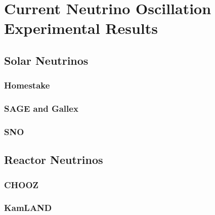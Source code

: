 \chapter{Current Neutrino Oscillation Experimental Results}
\label{current_results_chapter}


\section{Solar Neutrinos}

\subsection{Homestake}

\subsection{SAGE and Gallex}

\subsection{SNO}

\section{Reactor Neutrinos}

\subsection{CHOOZ}

\subsection{KamLAND}

